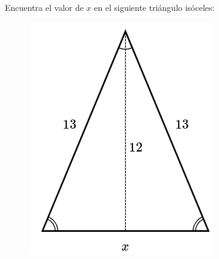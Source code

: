 Encuentra el valor de $x$ en el siguiente triángulo isóceles:

\begin{figure}[H]
    \centering
    \includegraphics[width=0.2\linewidth]{../images/pitagoras13.png}
    \caption{}
    \label{fig:pitagoras13}
\end{figure}
